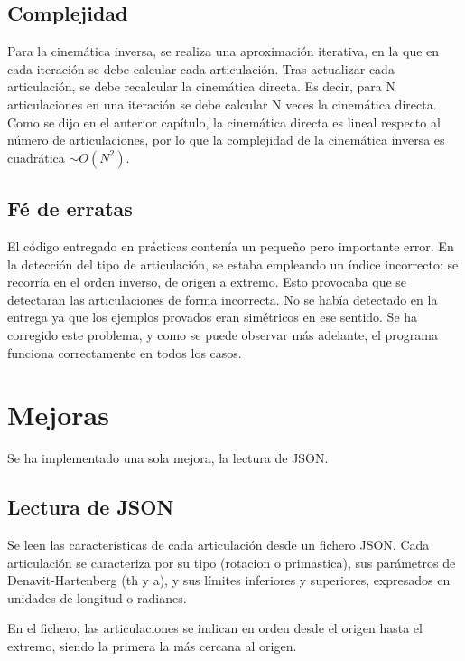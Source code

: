 \subsection{Complejidad}
Para la cinemática inversa, se realiza una aproximación iterativa, en la que en cada iteración se debe calcular cada articulación.
Tras actualizar cada articulación, se debe recalcular la cinemática directa.
Es decir, para N articulaciones en una iteración se debe calcular N veces la cinemática directa. Como se dijo en el anterior capítulo, la cinemática directa es lineal respecto al número de articulaciones, por lo que la complejidad de la cinemática inversa es cuadrática $\sim O(N^2) $.

\subsection{Fé de erratas}
El código entregado en prácticas contenía un pequeño pero importante error. En la detección del tipo de articulación, se estaba empleando un índice incorrecto: se recorría en el orden inverso, de origen a extremo. Esto provocaba que se detectaran las articulaciones de forma incorrecta. No se había detectado en la entrega ya que los ejemplos provados eran simétricos en ese sentido. Se ha corregido este problema, y como se puede observar más adelante, el programa funciona correctamente en todos los casos.



\section{Mejoras}
Se ha implementado una sola mejora, la lectura de JSON.

\subsection{Lectura de JSON}
Se leen las características de cada articulación desde un fichero JSON. Cada articulación se caracteriza por su tipo (rotacion o primastica), sus parámetros de Denavit-Hartenberg (th y a),
y sus límites inferiores y superiores, expresados en unidades de longitud o radianes.

En el fichero, las articulaciones se indican en orden desde el origen hasta el extremo, siendo la primera la más cercana al origen.

